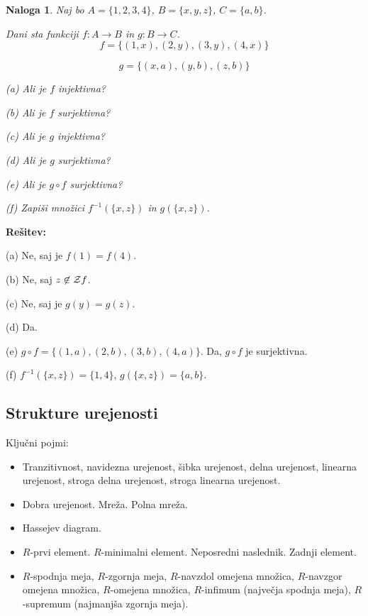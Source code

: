 \documentclass[11pt,paper=b5,footinclude,headinclude]{scrbook} %
\newtheorem*{problem}{Naloga}
\begin{document}
\begin{problem}
Naj bo $A = \{1,2,3,4\}$, $B = \{x,y,z\}$, $C = \{a,b\}$.

Dani sta funkciji $f:A\to B$ in $g:B\to C$.
$$f = \{(1,x),(2,y),(3,y),(4,x)\}$$

$$g = \{(x,a),(y,b),(z,b)\}$$

(a) Ali je $f$ injektivna?

(b) Ali je $f$ surjektivna?

(c) Ali je $g$ injektivna?

(d) Ali je $g$ surjektivna?

(e) Ali je $g\circ f$ surjektivna?

(f) Zapiši množici $f^{-1}(\{x,z\})$ in $g(\{x,z\})$.

\end{problem}

\textbf{Rešitev:}

(a) Ne, saj je $f(1) = f(4)$.

(b) Ne, saj $z\not\in{\cal Z} f$.

(c) Ne, saj je $g(y) = g(z)$.

(d) Da.

(e) $g\circ f = \{(1,a), (2,b), (3,b), (4,a)\}$. Da, $g\circ f$ je surjektivna.

(f) $f^{-1}(\{x,z\}) = \{1,4\}$, $g(\{x,z\}) = \{a,b\}$.
%
%
%
%

\subsection{Strukture urejenosti}
Ključni pojmi:
\begin{itemize}
\item Tranzitivnost, navidezna urejenost, šibka urejenost, delna urejenost,
linearna urejenost, stroga delna urejenost, stroga linearna urejenost.
\item Dobra urejenost. Mreža. Polna mreža.
\item Hassejev diagram.
\item $R$-prvi element. $R$-minimalni element. Neposredni naslednik. Zadnji element.
\item $R$-spodnja meja, $R$-zgornja meja, $R$-navzdol omejena množica, $R$-navzgor omejena
množica, $R$-omejena množica, $R$-infimum (največja spodnja meja),
$R$-supremum (najmanjša zgornja meja).
\end{itemize}
\end{document}
